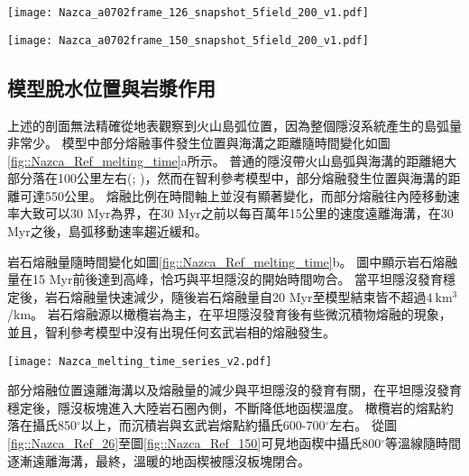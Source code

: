 \begin{figure*}[htp]
    \centering
    \texttt{[image: Nazca\_a0702frame\_126\_snapshot\_5field\_200\_v1.pdf]}
    \caption[智利參考模型於25 Myr時之結果。]{智利參考模型於25 Myr時之結果。}
    \label{fig::Nazca_Ref_126}
\end{figure*}


\begin{figure*}[htp]
    \centering
    \texttt{[image: Nazca\_a0702frame\_150\_snapshot\_5field\_200\_v1.pdf]}
    \caption[智利參考模型於30 Myr時之結果。]{智利參考模型於30 Myr時之結果。}
    \label{fig::Nazca_Ref_150}
\end{figure*}
\newpage
\subsection{模型脫水位置與岩漿作用}
上述的剖面無法精確從地表觀察到火山島弧位置，因為整個隱沒系統產生的島弧量非常少。
模型中部分熔融事件發生位置與海溝之距離隨時間變化如圖\ref{fig::Nazca_Ref_melting_time}a所示。
普通的隱沒帶火山島弧與海溝的距離絕大部分落在100公里左右(\citealp{peacock1990fluid}; \citealp{hyndman2003serpentinization})，然而在智利參考模型中，部分熔融發生位置與海溝的距離可達550公里。
熔融比例在時間軸上並沒有顯著變化，而部分熔融往內陸移動速率大致可以30 Myr為界，在30 Myr之前以每百萬年15公里的速度遠離海溝，在30 Myr之後，島弧移動速率趨近緩和。

岩石熔融量隨時間變化如圖\ref{fig::Nazca_Ref_melting_time}b。
圖中顯示岩石熔融量在15 Myr前後達到高峰，恰巧與平坦隱沒的開始時間吻合。
當平坦隱沒發育穩定後，岩石熔融量快速減少，隨後岩石熔融量自20 Myr至模型結束皆不超過4$\ $km$^3$/km。
岩石熔融源以橄欖岩為主，在平坦隱沒發育後有些微沉積物熔融的現象，並且，智利參考模型中沒有出現任何玄武岩相的熔融發生。

\begin{figure*}[h]
    \centering
    \texttt{[image: Nazca\_melting\_time\_series\_v2.pdf]}
    \caption[智利參考模型岩漿作用隨時間變化]{智利參考模型岩漿作用隨時間變化，灰色底標出平坦隱沒發育後時間段。(a)部分熔融與海溝之距離隨時間變化圖，縱軸中每個點代表每次部分熔融發生位置，顏色為指數上的部分熔融比例。(b)岩石熔融量隨時間變化圖，熔融量單位為每20萬年瞬時每單位海溝之立方公里量。顏色代表不同岩相。(c)岩漿庫體積隨時間變化圖，岩漿庫單位為每單位海溝之立方公里量。顏色代表該時間中最大部分熔融發生量的所在深度。}
    \label{fig::Nazca_Ref_melting_time}
\end{figure*}

部分熔融位置遠離海溝以及熔融量的減少與平坦隱沒的發育有關，在平坦隱沒發育穩定後，隱沒板塊進入大陸岩石圈內側，不斷降低地函楔溫度。
橄欖岩的熔點約落在攝氏850$^{\circ}$以上，而沉積岩與玄武岩熔點約攝氏600-700$^{\circ}$左右。
從圖\ref{fig::Nazca_Ref_26}至圖\ref{fig::Nazca_Ref_150}可見地函楔中攝氏800$^{\circ}$等溫線隨時間逐漸遠離海溝，最終，溫暖的地函楔被隱沒板塊閉合。

